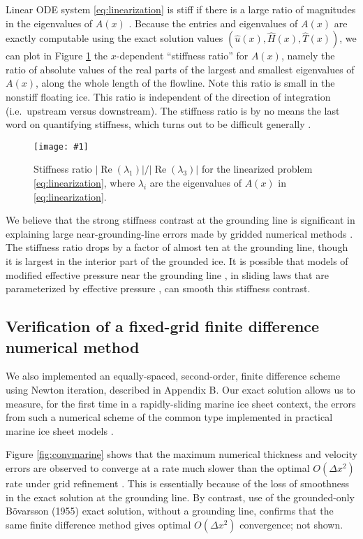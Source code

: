 \documentclass[twocolumn]{igs}
\renewcommand{\dh}{\fontencoding{T1}\selectfont{\symbol{240}}}
\newcommand{\onecol}[1]{\texttt{[image: \#1]}}
\newcommand{\citebod}{B\"o\dh varsson (1955)\nocite{Bodvardsson}\xspace}
\newcommand{\hu}{\hat u}
\newcommand{\hH}{\hat H}
\newcommand{\hT}{\hat T}
\begin{document}
Linear ODE system \eqref{eq:linearization} is stiff if there is a large ratio of magnitudes in the eigenvalues of $A(x)$ \citep{Pressetal}.  Because the entries and eigenvalues of $A(x)$ are exactly computable using the exact solution values $(\hu(x),\hH(x),\hT(x))$, we can plot in Figure \ref{fig:stiffness} the $x$-dependent ``stiffness ratio'' for $A(x)$, namely the ratio of absolute values of the real parts of the largest and smallest eigenvalues of $A(x)$, along the whole length of the flowline.  Note this ratio is small in the nonstiff floating ice.  This ratio is independent of the direction of integration (i.e.~upstream versus downstream).  The stiffness ratio is by no means the last word on quantifying stiffness, which turns out to be difficult generally \citep[e.g.][]{HighamTrefethen1993}.

\begin{figure}[ht]
\onecol{em-stiffness-ratio}
\caption{Stiffness ratio $|\operatorname{Re}(\lambda_1)|/|\operatorname{Re}(\lambda_3)|$ for the linearized problem \eqref{eq:linearization}, where $\lambda_i$ are the eigenvalues of $A(x)$ in \eqref{eq:linearization}.} \label{fig:stiffness}
\end{figure}

We believe that the strong stiffness contrast at the grounding line is significant in explaining large near-grounding-line errors made by gridded numerical methods \citep{Gladstoneetal2010,MISMIP2012}.  The stiffness ratio drops by a factor of almost ten at the grounding line, though it is largest in the interior part of the grounded ice.  It is possible that models of modified effective pressure near the grounding line \citep{Leguyetal2014}, in sliding laws that are parameterized by effective pressure \citep{Schoof2005cavitation}, can smooth this stiffness contrast.

\subsection*{Verification of a fixed-grid finite difference numerical method}  We also implemented an equally-spaced, second-order, finite difference scheme using Newton iteration, described in Appendix B.  Our exact solution allows us to measure, for the first time in a rapidly-sliding marine ice sheet context, the errors from such a numerical scheme of the common type implemented in practical marine ice sheet models \citep[e.g.][]{PollardDeConto2009WAIS,Winkelmannetal2011}.

Figure \ref{fig:convmarine} shows that the maximum numerical thickness and velocity errors are observed to converge at a rate much slower than the optimal $O(\Delta x^2)$ rate under grid refinement \citep{MortonMayers}.  This is essentially because of the loss of smoothness in the exact solution at the grounding line.  By contrast, use of the grounded-only \citebod exact solution, without a grounding line, confirms that the same finite difference method gives optimal $O(\Delta x^2)$ convergence; not shown.
\end{document}
